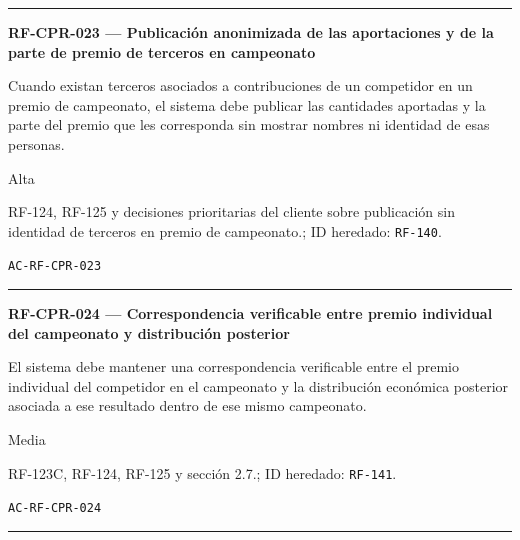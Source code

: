 \documentclass[10pt,letterpaper]{article}
\begin{document}
\vspace{0.25em}\hrule\vspace{0.65em}
\noindent\textbf{RF-CPR-023 --- Publicación anonimizada de las aportaciones y de la parte de premio de terceros en campeonato}\par
\begin{description}[style=nextline,leftmargin=3.15cm,labelwidth=2.8cm,font=\normalfont\bfseries]
\item[Obligación] Cuando existan terceros asociados a contribuciones de un competidor en un premio de campeonato, el sistema debe publicar las cantidades aportadas y la parte del premio que les corresponda sin mostrar nombres ni identidad de esas personas.
\item[Prioridad] Alta
\item[Procedencia] RF-124, RF-125 y decisiones prioritarias del cliente sobre publicación sin identidad de terceros en premio de campeonato.; ID heredado: \texttt{RF-140}.
\item[Verificación] \texttt{AC-RF-CPR-023}
\end{description}
\vspace{0.25em}\hrule\vspace{0.65em}
\noindent\textbf{RF-CPR-024 --- Correspondencia verificable entre premio individual del campeonato y distribución posterior}\par
\begin{description}[style=nextline,leftmargin=3.15cm,labelwidth=2.8cm,font=\normalfont\bfseries]
\item[Obligación] El sistema debe mantener una correspondencia verificable entre el premio individual del competidor en el campeonato y la distribución económica posterior asociada a ese resultado dentro de ese mismo campeonato.
\item[Prioridad] Media
\item[Procedencia] RF-123C, RF-124, RF-125 y sección 2.7.; ID heredado: \texttt{RF-141}.
\item[Verificación] \texttt{AC-RF-CPR-024}
\end{description}
\vspace{0.25em}\hrule\vspace{0.65em}
\end{document}
